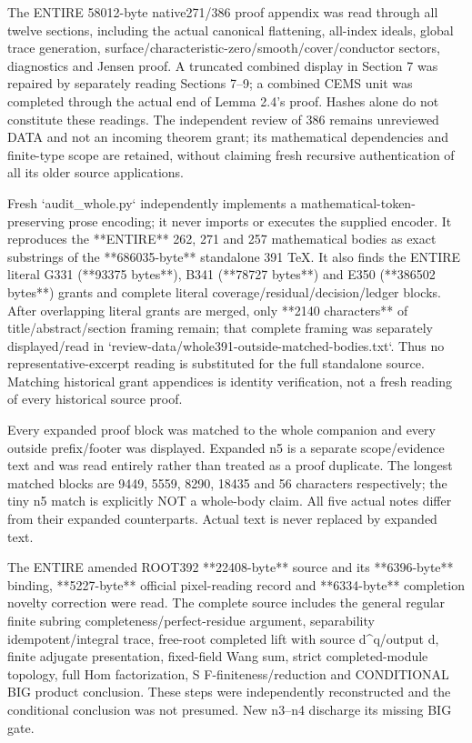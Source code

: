 \documentclass[11pt]{article}
\begin{document}
The ENTIRE 58012-byte native271/386 proof appendix was read through all twelve sections, including the actual canonical flattening, all-index ideals, global trace generation, surface/characteristic-zero/smooth/cover/conductor sectors, diagnostics and Jensen proof. A truncated combined display in Section 7 was repaired by separately reading Sections 7--9; a combined CEMS unit was completed through the actual end of Lemma 2.4's proof. Hashes alone do not constitute these readings. The independent review of 386 remains unreviewed DATA and not an incoming theorem grant; its mathematical dependencies and finite-type scope are retained, without claiming fresh recursive authentication of all its older source applications.

Fresh `audit\_whole.py` independently implements a mathematical-token-preserving prose encoding; it never imports or executes the supplied encoder. It reproduces the **ENTIRE** 262, 271 and 257 mathematical bodies as exact substrings of the **686035-byte** standalone 391 TeX. It also finds the ENTIRE literal G331 (**93375 bytes**), B341 (**78727 bytes**) and E350 (**386502 bytes**) grants and complete literal coverage/residual/decision/ledger blocks. After overlapping literal grants are merged, only **2140 characters** of title/abstract/section framing remain; that complete framing was separately displayed/read in `review-data/whole391-outside-matched-bodies.txt`. Thus no representative-excerpt reading is substituted for the full standalone source. Matching historical grant appendices is identity verification, not a fresh reading of every historical source proof.

Every expanded proof block was matched to the whole companion and every outside prefix/footer was displayed. Expanded n5 is a separate scope/evidence text and was read entirely rather than treated as a proof duplicate. The longest matched blocks are 9449, 5559, 8290, 18435 and 56 characters respectively; the tiny n5 match is explicitly NOT a whole-body claim. All five actual notes differ from their expanded counterparts. Actual text is never replaced by expanded text.

The ENTIRE amended ROOT392 **22408-byte** source and its **6396-byte** binding, **5227-byte** official pixel-reading record and **6334-byte** completion novelty correction were read. The complete source includes the general regular finite subring completeness/perfect-residue argument, separability idempotent/integral trace, free-root completed lift with source d\textasciicircum{}q/output d, finite adjugate presentation, fixed-field Wang sum, strict completed-module topology, full Hom factorization, S F-finiteness/reduction and CONDITIONAL BIG product conclusion. These steps were independently reconstructed and the conditional conclusion was not presumed. New n3--n4 discharge its missing BIG gate.
\end{document}
